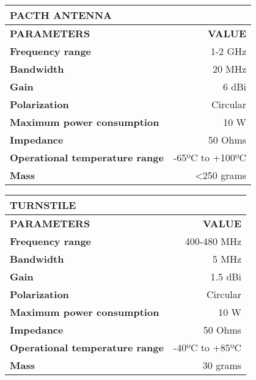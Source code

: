 \begin{longtable}{| l | r |}

\hline
\rowcolor[gray]{0.60}	\textbf{PACTH ANTENNA} \\
\hline

\hline
\rowcolor[gray]{0.75}	\textbf{PARAMETERS} &  \textbf{VALUE}   \\
\hline

\cellcolor[gray]{0.85} \textbf{Frequency range} & 1-2 GHz  \\
\cellcolor[gray]{0.85} \textbf{Bandwidth} & 20 MHz \\
\cellcolor[gray]{0.85} \textbf{Gain} & 6 dBi  \\
\cellcolor[gray]{0.85} \textbf{Polarization} & Circular \\
\cellcolor[gray]{0.85} \textbf{Maximum power consumption} & 10 W \\
\cellcolor[gray]{0.85} \textbf{Impedance} & 50 Ohms \\
\cellcolor[gray]{0.85} \textbf{Operational temperature range} & -65ºC to +100ºC \\
\cellcolor[gray]{0.85} \textbf{Mass} & <250 grams \\
\hline

\end{longtable}

\begin{longtable}{| l | r |}

\hline
\rowcolor[gray]{0.60}	\textbf{TURNSTILE} \\
\hline

\hline
\rowcolor[gray]{0.75}	\textbf{PARAMETERS} &  \textbf{VALUE}   \\
\hline

\cellcolor[gray]{0.85} \textbf{Frequency range} & 400-480 MHz  \\
\cellcolor[gray]{0.85} \textbf{Bandwidth} & 5 MHz \\
\cellcolor[gray]{0.85} \textbf{Gain} & 1.5 dBi \\
\cellcolor[gray]{0.85} \textbf{Polarization} & Circular \\
\cellcolor[gray]{0.85} \textbf{Maximum power consumption} & 10 W \\
\cellcolor[gray]{0.85} \textbf{Impedance} & 50 Ohms \\
\cellcolor[gray]{0.85} \textbf{Operational temperature range} & -40ºC to +85ºC \\
\cellcolor[gray]{0.85} \textbf{Mass} & 30 grams \\
\hline

\end{longtable}
